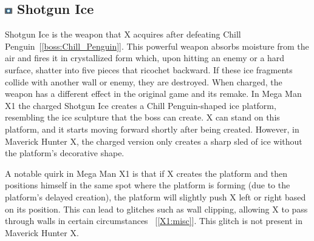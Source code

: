\subsection{\includegraphics[width=12px, height=10px]{figures/X1/weapons/S_ice.jpg} Shotgun Ice}\label{Shotgun_ice}

Shotgun Ice is the weapon that X acquires after defeating Chill Penguin~[\ref{boss:Chill_Penguin}]. This powerful weapon absorbs moisture from the air and fires it in crystallized form which, upon hitting an enemy or a hard surface, shatter into five pieces that ricochet backward. If these ice fragments collide with another wall or enemy, they are destroyed. When charged, the weapon has a different effect in the original game and its remake. In Mega Man X1 the charged Shotgun Ice creates a Chill Penguin-shaped ice platform, resembling the ice sculpture that the boss can create. X can stand on this platform, and it starts moving forward shortly after being created. However, in Maverick Hunter X, the charged version only creates a sharp sled of ice without the platform's decorative shape.

A notable quirk in Mega Man X1 is that if X creates the platform and then positions himself in the same spot where the platform is forming (due to the platform's delayed creation), the platform will slightly push X left or right based on its position. This can lead to glitches such as wall clipping, allowing X to pass through walls in certain circumstances ~[\ref{X1:misc}]. This glitch is not present in Maverick Hunter X.

